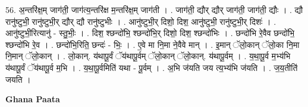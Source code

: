 \documentclass[17pt]{extarticle}
\begin{document}
56. अ॒न्तरि॑क्ष॒म् जाग॑ती॒ जाग॑त्य॒न्तरि॑क्ष म॒न्तरि॑क्ष॒म् जाग॑ती । . जाग॑ती॒ द्यौर् द्यौर् जाग॑ती॒ जाग॑ती॒ द्यौः । . द्यौ रानु॑ष्टुभी॒ रानु॑ष्टुभी॒र् द्यौर् द्यौ रानु॑ष्टुभीः । . आनु॑ष्टुभी॒र् दिशो॒ दिश॒ आनु॑ष्टुभी॒ रानु॑ष्टुभी॒र् दिशः॑ । . आनु॑ष्टुभी॒रित्यानु॑ - स्तु॒भीः॒ । . दिश॒ श्छन्दो॑भि॒ श्छन्दो॑भि॒र् दिशो॒ दिश॒ श्छन्दो॑भिः । . छन्दो॑भि रे॒वैव छन्दो॑भि॒ श्छन्दो॑भि रे॒व । . छन्दो॑भि॒रिति॒ छन्दः॑ - भिः॒ । . ए॒वे मा नि॒मा ने॒वैवे मान् । . इ॒मान् ॅलो॒कान् ॅलो॒का नि॒मा नि॒मान् ॅलो॒कान् । . लो॒कान्. य॑थापू॒र्वं ॅय॑थापू॒र्वम् ॅलो॒कान् ॅलो॒कान्. य॑थापू॒र्वम् । . य॒था॒पू॒र्व म॒भ्य॑भि य॑थापू॒र्वं ॅय॑थापू॒र्व म॒भि । . य॒था॒पू॒र्वमिति॑ यथा - पू॒र्वम् । . अ॒भि ज॑यति जय त्य॒भ्य॑भि ज॑यति । . ज॒य॒तीति॑ जयति । \newline

\textbf{Ghana Paata } \newline
\end{document}
